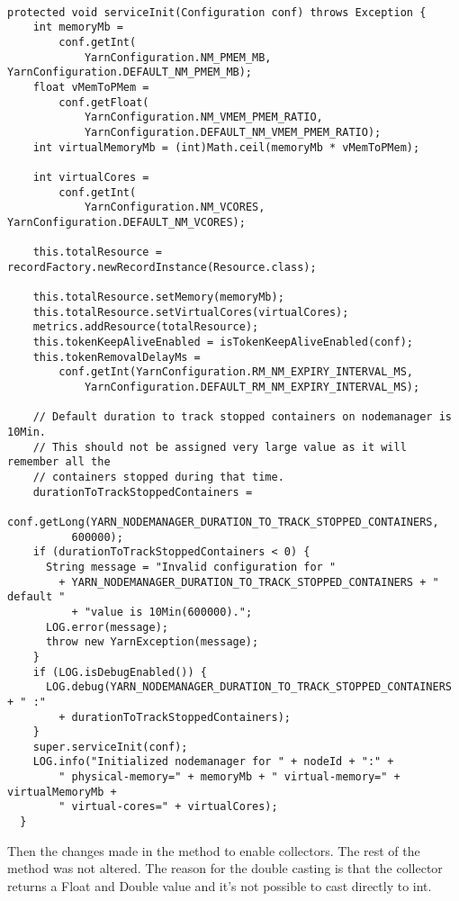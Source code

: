 \begin{lstlisting}

protected void serviceInit(Configuration conf) throws Exception {
    int memoryMb = 
        conf.getInt(
            YarnConfiguration.NM_PMEM_MB, YarnConfiguration.DEFAULT_NM_PMEM_MB);
    float vMemToPMem =             
        conf.getFloat(
            YarnConfiguration.NM_VMEM_PMEM_RATIO, 
            YarnConfiguration.DEFAULT_NM_VMEM_PMEM_RATIO); 
    int virtualMemoryMb = (int)Math.ceil(memoryMb * vMemToPMem);
    
    int virtualCores =
        conf.getInt(
            YarnConfiguration.NM_VCORES, YarnConfiguration.DEFAULT_NM_VCORES);

    this.totalResource = recordFactory.newRecordInstance(Resource.class);

    this.totalResource.setMemory(memoryMb);
    this.totalResource.setVirtualCores(virtualCores);
	metrics.addResource(totalResource);
    this.tokenKeepAliveEnabled = isTokenKeepAliveEnabled(conf);
    this.tokenRemovalDelayMs =
        conf.getInt(YarnConfiguration.RM_NM_EXPIRY_INTERVAL_MS,
            YarnConfiguration.DEFAULT_RM_NM_EXPIRY_INTERVAL_MS);
    
    // Default duration to track stopped containers on nodemanager is 10Min.
    // This should not be assigned very large value as it will remember all the
    // containers stopped during that time.
    durationToTrackStoppedContainers =
        conf.getLong(YARN_NODEMANAGER_DURATION_TO_TRACK_STOPPED_CONTAINERS,
          600000);
    if (durationToTrackStoppedContainers < 0) {
      String message = "Invalid configuration for "
        + YARN_NODEMANAGER_DURATION_TO_TRACK_STOPPED_CONTAINERS + " default "
          + "value is 10Min(600000).";
      LOG.error(message);
      throw new YarnException(message);
    }
    if (LOG.isDebugEnabled()) {
      LOG.debug(YARN_NODEMANAGER_DURATION_TO_TRACK_STOPPED_CONTAINERS + " :"
        + durationToTrackStoppedContainers);
    }
    super.serviceInit(conf);
    LOG.info("Initialized nodemanager for " + nodeId + ":" +
        " physical-memory=" + memoryMb + " virtual-memory=" + virtualMemoryMb +
        " virtual-cores=" + virtualCores);
  }
\end{lstlisting}

Then the changes made in the method to enable collectors. The rest of the method was not altered. The reason for the double casting is that the collector returns a Float and Double value and it's not possible to cast directly to int.

